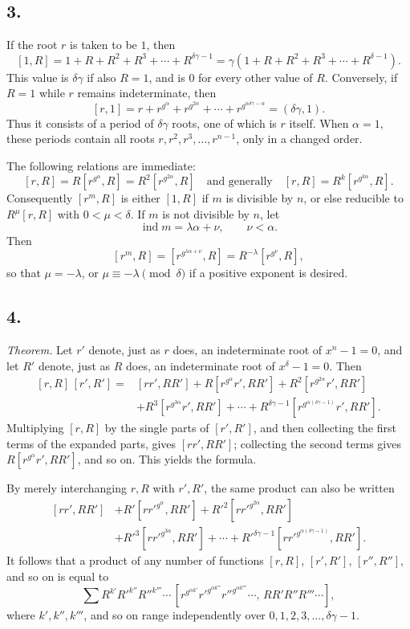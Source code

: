 \documentclass[12pt]{article}
\begin{document}
\subsection*{3.}

If the root $r$ is taken to be $1$, then
\[
[1,R]=1+R+R^2+R^3+\cdots+R^{\delta\gamma-1}
=\gamma(1+R+R^2+R^3+\cdots+R^{\delta-1}).
\]
This value is $\delta\gamma$ if also $R=1$, and is $0$ for every other value of $R$. Conversely, if $R=1$ while $r$ remains indeterminate, then
\[
[r,1]=r+r^{g^\alpha}+r^{g^{2\alpha}}+\cdots+r^{g^{\alpha\delta\gamma-\alpha}}
=(\delta\gamma,1).
\]
Thus it consists of a period of $\delta\gamma$ roots, one of which is $r$ itself. When $\alpha=1$, these periods contain all roots $r,r^2,r^3,\ldots,r^{n-1}$, only in a changed order.

The following relations are immediate:
\[
[r,R]=R[r^{g^\alpha},R]=R^2[r^{g^{2\alpha}},R]\quad\text{and generally}\quad
[r,R]=R^k[r^{g^{k\alpha}},R].
\]
Consequently $[r^m,R]$ is either $[1,R]$ if $m$ is divisible by $n$, or else reducible to $R^\mu[r,R]$ with $0<\mu<\delta$. If $m$ is not divisible by $n$, let
\[
\operatorname{ind}m=\lambda\alpha+\nu,\qquad \nu<\alpha.
\]
Then
\[
[r^m,R]=[r^{g^{\lambda\alpha+\nu}},R]=R^{-\lambda}[r^{g^\nu},R],
\]
so that $\mu=-\lambda$, or $\mu\equiv-\lambda\pmod\delta$ if a positive exponent is desired.

\subsection*{4.}

\emph{Theorem.} Let $r'$ denote, just as $r$ does, an indeterminate root of $x^n-1=0$, and let $R'$ denote, just as $R$ does, an indeterminate root of $x^\delta-1=0$. Then
\[
\begin{aligned}
[r,R]\,[r',R']={}&[rr',RR']+R[r^{g^\alpha}r',RR']
+R^2[r^{g^{2\alpha}}r',RR']\\
&+R^3[r^{g^{3\alpha}}r',RR']+\cdots+
R^{\delta\gamma-1}[r^{g^{\alpha(\delta\gamma-1)}}r',RR'].
\end{aligned}
\]
Multiplying $[r,R]$ by the single parts of $[r',R']$, and then collecting the first terms of the expanded parts, gives $[rr',RR']$; collecting the second terms gives $R[r^{g^\alpha}r',RR']$, and so on. This yields the formula.

By merely interchanging $r,R$ with $r',R'$, the same product can also be written
\[
\begin{aligned}
[rr',RR']&+R'[rr'^{g^\alpha},RR']+R'^2[rr'^{g^{2\alpha}},RR']\\
&+R'^3[rr'^{g^{3\alpha}},RR']+\cdots+
R'^{\delta\gamma-1}[rr'^{g^{\alpha(\delta\gamma-1)}},RR'].
\end{aligned}
\]
It follows that a product of any number of functions $[r,R]$, $[r',R']$, $[r'',R'']$, and so on is equal to
\[
\sum R^{k'}R'^{k''}R''^{k'''}\cdots
\,[r^{g^{\alpha k'}}r'^{g^{\alpha k''}}r''^{g^{\alpha k'''}}\cdots,\,
RR'R''R'''\cdots],
\]
where $k',k'',k'''$, and so on range independently over $0,1,2,3,\ldots,\delta\gamma-1$.
\end{document}
